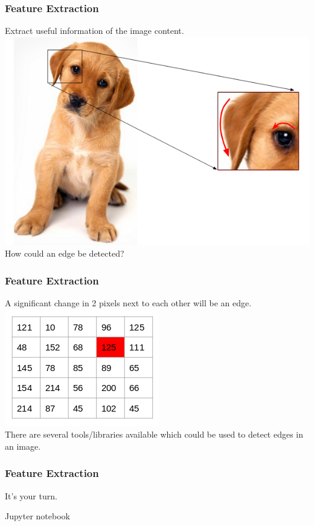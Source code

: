 \begin{frame}[fragile]
  \frametitle{Feature Extraction}
  Extract useful information of the image content.\\
  \vspace{3mm}
  \includegraphics[scale=0.4]{img/img_5}\\
  \vspace{3mm}
  How could an edge be detected?
\end{frame}

\begin{frame}[fragile]
  \frametitle{Feature Extraction}
  A significant change in 2 pixels next to each other will be an edge.\\
  \vspace{3mm}
  \includegraphics[scale=0.4]{img/img_6}\\
  \vspace{3mm}
  There are several tools/libraries available which could be used
  to detect edges in an image.
\end{frame}

\begin{frame}[fragile]
  \frametitle{Feature Extraction}
  It's your turn.
  \begin{exercise}
  Jupyter notebook
  \end{exercise}
\end{frame}
